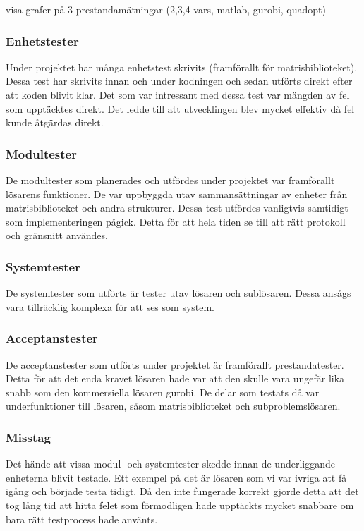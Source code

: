	visa grafer på 3 prestandamätningar (2,3,4 vars, matlab, gurobi, quadopt) 	
	
	\subsubsection{Enhetstester}
	Under projektet har många enhetstest skrivits (framförallt för matrisbiblioteket). Dessa test har skrivits innan och under kodningen och sedan utförts direkt efter att koden blivit klar. Det som var intressant med dessa test var mängden av fel som upptäcktes direkt. Det ledde till att utvecklingen blev mycket effektiv då fel kunde åtgärdas direkt.
	
	\subsubsection{Modultester}
	De modultester som planerades och utfördes under projektet var framförallt lösarens funktioner. De var uppbyggda utav sammansättningar av enheter från matrisbiblioteket och andra strukturer. Dessa test utfördes vanligtvis samtidigt som implementeringen pågick. Detta för att hela tiden se till att rätt protokoll och gränsnitt användes.
	
	\subsubsection{Systemtester}
	De systemtester som utförts är tester utav lösaren och sublösaren. Dessa ansågs vara tillräcklig komplexa för att ses som system. 
	
	
	\subsubsection{Acceptanstester}
	De acceptanstester som utförts under projektet är framförallt prestandatester. Detta för att det enda kravet lösaren hade var att den skulle vara ungefär lika snabb som den kommersiella lösaren gurobi. De delar som testats då var underfunktioner till lösaren, såsom matrisbiblioteket och subproblemslösaren.
	
	\subsubsection{Misstag}
	Det hände att vissa modul- och systemtester skedde innan de underliggande enheterna blivit testade. Ett exempel på det är lösaren som vi var ivriga att få igång och började testa tidigt. Då den inte fungerade korrekt gjorde detta att det tog lång tid att hitta felet som förmodligen hade upptäckts mycket snabbare om bara rätt testprocess hade använts.
	
